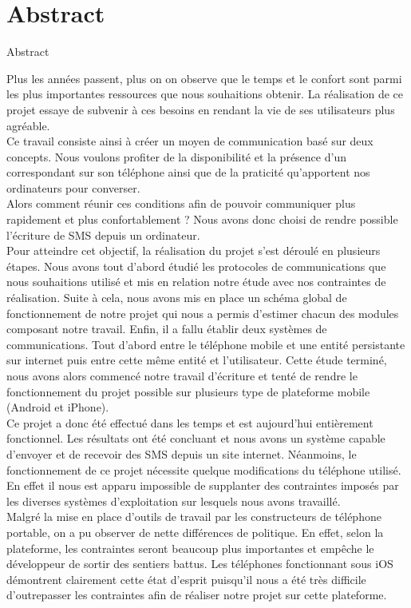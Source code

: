 \cleardoublepage



\chapter*{Abstract}

\thispagestyle{empty}


Abstract


Plus les années passent, plus on on observe que le temps et le confort sont parmi
les plus importantes ressources que nous souhaitions obtenir. La réalisation de ce
projet essaye de subvenir à ces besoins en rendant la vie de ses utilisateurs plus agréable.
\\
Ce travail consiste ainsi à créer un moyen de communication basé sur deux concepts.
Nous voulons profiter de la disponibilité et la présence d'un correspondant sur son 
téléphone ainsi que de la praticité qu'apportent nos ordinateurs pour converser.
\\
Alors comment réunir ces conditions afin de pouvoir communiquer plus rapidement et plus confortablement ?
Nous avons donc choisi de rendre possible l'écriture de SMS depuis un ordinateur. 
\\
Pour atteindre cet objectif, la réalisation du projet s'est déroulé en plusieurs étapes.
Nous avons tout d'abord étudié les protocoles de communications que nous souhaitions utilisé
et mis en relation notre étude avec nos contraintes de réalisation. Suite à cela, nous avons
mis en place un schéma global de fonctionnement de notre projet qui nous a permis d'estimer
chacun des modules composant notre travail. Enfin, il a fallu établir deux systèmes de communications.
Tout d'abord entre le téléphone mobile et une entité persistante sur internet puis entre
cette même entité et l'utilisateur. Cette étude terminé, nous avons alors commencé notre
travail d'écriture et tenté de rendre le fonctionnement du projet possible sur plusieurs
type de plateforme mobile (Android et iPhone).
\\
Ce projet a donc été effectué dans les temps et est aujourd'hui entièrement fonctionnel.
Les résultats ont été concluant et nous avons un système capable d'envoyer et de recevoir
des SMS depuis un site internet. Néanmoins, le fonctionnement de ce projet nécessite quelque 
modifications du téléphone utilisé. En effet il nous est apparu impossible de supplanter
des contraintes imposés par les diverses systèmes d'exploitation sur lesquels nous avons travaillé.
\\
Malgré la mise en place d'outils de travail par les constructeurs de téléphone portable,
on a pu observer de nette différences de politique. En effet, selon la plateforme, les contraintes
seront beaucoup plus importantes et empêche le développeur de sortir des sentiers battus. 
Les téléphones fonctionnant sous iOS démontrent clairement cette état d'esprit puisqu'il 
nous a été très difficile  d'outrepasser les contraintes afin de réaliser notre projet sur cette plateforme.

